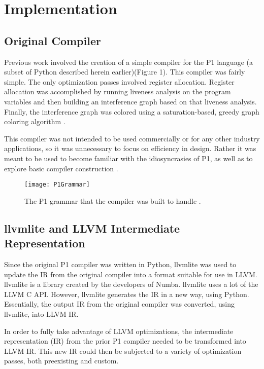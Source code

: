 \section{Implementation}

\subsection{Original Compiler}

Previous work involved the creation of a simple compiler for the P1 language (a subset of Python described herein earlier)(Figure 1). This compiler was fairly simple. The only optimization passes involved register allocation. Register allocation was accomplished by running liveness analysis on the program variables and then building an interference graph based on that liveness analysis. Finally, the interference graph was colored using a saturation-based, greedy graph coloring algorithm \cite{Chang17}.

This compiler was not intended to be used commercially or for any other industry applications, so it was unnecessary to focus on efficiency in design. Rather it was meant to be used to become familiar with the idiosyncrasies of P1, as well as to explore basic compiler construction \cite{Chang17}.

\begin{figure}
\texttt{[image: P1Grammar]}
\caption{The P1 grammar that the compiler was built to handle \cite{Chang17}.}
\end{figure}

\subsection{llvmlite and LLVM Intermediate Representation}

Since the original P1 compiler was written in Python, llvmlite was used to update the IR from the original compiler into a format suitable for use in LLVM. llvmlite is a library created by the developers of Numba. llvmlite uses a lot of the LLVM C API. However, llvmlite generates the IR in a new way, using Python. Essentially, the output IR from the original compiler was converted, using llvmlite, into LLVM IR\cite{LLVMIR}.

In order to fully take advantage of LLVM optimizations, the intermediate representation (IR) from the prior P1 compiler needed to be transformed into LLVM IR. This new IR could then be subjected to a variety of optimization passes, both preexisting and custom.

